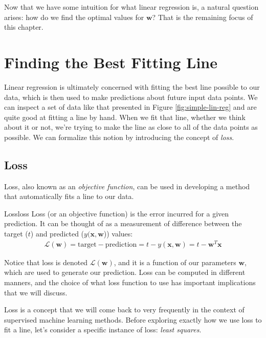 
Now that we have some intuition for what linear regression is, a natural question arises: how do we find the optimal values for $\textbf{w}$? That is the remaining focus of this chapter.

\section{Finding the Best Fitting Line}
Linear regression is ultimately concerned with fitting the best line possible to our data, which is then used to make predictions about future input data points. We can inspect a set of data like that presented in Figure \ref{fig:simple-lin-reg} and are quite good at fitting a line by hand. When we fit that line, whether we think about it or not, we're trying to make the line as close to all of the data points as possible. We can formalize this notion by introducing the concept of \textit{loss}.

\subsection{Loss}
Loss, also known as an \textit{objective function}, can be used in developing a method that automatically fits a line to our data.

\begin{definition}{Loss}{loss}
Loss (or an objective function) is the error incurred for a given prediction. It can be thought of as a measurement of difference between the target ($t$) and predicted ($y(\textbf{x}, \textbf{w}$)) values:
\begin{align*}
    \mathcal{L}(\textbf{w}) = \text{target} - \text{prediction} = t - y(\textbf{x}, \textbf{w}) = \boxed{t - \textbf{w}^{T}\textbf{x}}
\end{align*}

Notice that loss is denoted $\mathcal{L}(\textbf{w})$, and it is a function of our parameters $\textbf{w}$, which are used to generate our prediction. Loss can be computed in different manners, and the choice of what loss function to use has important implications that we will discuss.
\end{definition}

Loss is a concept that we will come back to very frequently in the context of supervised machine learning methods. Before exploring exactly how we use loss to fit a line, let's consider a specific instance of loss: \textit{least squares}.

